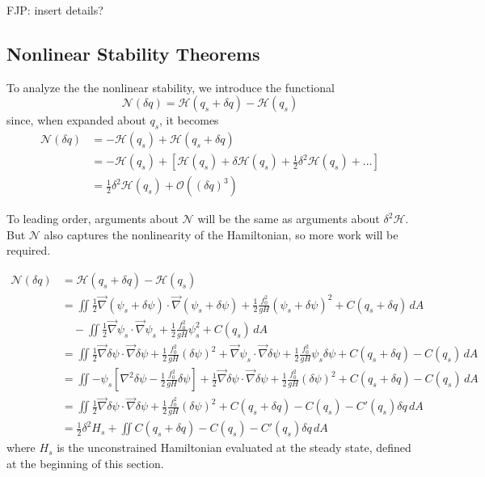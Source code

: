\documentclass[12pt]{article}
\begin{document}
    FJP: insert details?
  
  \subsection{Nonlinear Stability Theorems}
  
    To analyze the the nonlinear stability, we introduce the functional
    $$
    \mathcal{N}(\delta q)  = \mathcal{H}(q_s + \delta q) - \mathcal{H}(q_s)
    $$
    since, when expanded about $q_s$, it becomes
    \begin{align*}
      \mathcal{N}(\delta q) 
      &= - \mathcal{H}(q_s) + \mathcal{H}(q_s + \delta q) \\
      & = - \mathcal{H}(q_s) + \left[ \mathcal{H}(q_s) + \delta \mathcal{H}(q_s)+ \frac12 \delta^2 \mathcal{H}(q_s) + ... \right] \\
      &= \frac12 \delta^2 \mathcal{H}(q_s) + \mathcal{O}((\delta q)^3)
    \end{align*}
  
    To leading order, arguments about $\mathcal{N}$ will be the same as arguments about $\delta^2 \mathcal{H}$. But $\mathcal{N}$ also captures the nonlinearity of the Hamiltonian, so more work will be required.
  
    \begin{align*}
      \mathcal{N}(\delta q) 
      & = \mathcal{H}(q_s + \delta q) - \mathcal{H}(q_s) \\
      &= \iint  \frac12 \vec\nabla(\psi_s + \delta \psi) \cdot \vec\nabla(\psi_s + \delta \psi) + \frac12 \frac{f_0^2}{g H} (\psi_s + \delta \psi)^2 + C(q_s + \delta q) \, dA \\
       & \quad - \iint  \frac12 \vec\nabla\psi_s \cdot \vec\nabla\psi_s + \frac12 \frac{f_0^2}{g H} \psi_s^2 + C(q_s) \, dA \\
      &= \iint \frac12 \vec\nabla\delta\psi \cdot \vec\nabla\delta\psi + \frac12 \frac{f_0^2}{g H} (\delta \psi)^2 + \vec\nabla\psi_s \cdot \vec\nabla\delta\psi + \frac12 \frac{f_0^2}{g H} \psi_s\delta\psi + C(q_s + \delta q) - C(q_s) \, dA \\
      &= \iint -\psi_s \left[ \nabla^2\delta\psi - \frac12 \frac{f_0^2}{g H} \delta\psi \right] + \frac12 \vec\nabla\delta\psi \cdot \vec\nabla\delta\psi + \frac12 \frac{f_0^2}{g H}(\delta\psi)^2 + C(q_s + \delta q) - C(q_s) \, dA \\
      &= \iint \frac12 \vec\nabla\delta\psi \cdot \vec\nabla\delta\psi + \frac12 \frac{f_0^2}{g H}(\delta \psi)^2 + C(q_s + \delta q) - C(q_s) -C'(q_s)\delta q\, dA \\
      &= \frac12 \delta^2 H_s + \iint C(q_s + \delta q) - C(q_s) -C'(q_s)\delta q\, dA
    \end{align*}
    where $H_s$ is the unconstrained Hamiltonian evaluated at the steady state, defined at the beginning of this section.
\end{document}
